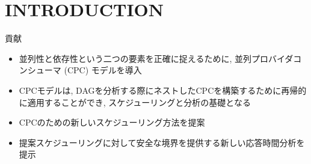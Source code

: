 
\section{INTRODUCTION}
\label{sec: introduction}

\begin{frame}{貢献}
    \begin{itemize}
        \item 並列性と依存性という二つの要素を正確に捉えるために, 並列プロバイダコンシューマ (CPC) モデルを導入
        \item CPCモデルは, DAGを分析する際にネストしたCPCを構築するために再帰的に適用することができ, スケジューリングと分析の基礎となる
        \item CPCのための新しいスケジューリング方法を提案
        \item 提案スケジューリングに対して安全な境界を提供する新しい応答時間分析を提示
    \end{itemize}
\end{frame}
